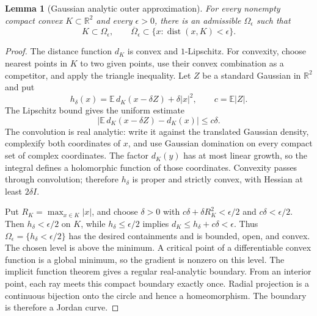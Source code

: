 \documentclass[11pt]{article}
\newcommand{\R}{\mathbb R}
\DeclareMathOperator{\dist}{dist}
\newtheorem{lemma}[theorem]{Lemma}
\theoremstyle{definition}
\theoremstyle{remark}
\numberwithin{equation}{section}
\begin{document}
\begin{lemma}[Gaussian analytic outer approximation]\label{lem:gaussian}
For every nonempty compact convex $K\subset\R^2$ and every $\epsilon>0$,
there is an admissible $\Omega_\epsilon$ such that
\[
 K\subset\Omega_\epsilon,\qquad
 \overline\Omega_\epsilon\subset\{x:\dist(x,K)<\epsilon\}.
\]
\end{lemma}
\begin{proof}
The distance function $d_K$ is convex and $1$-Lipschitz. For convexity,
choose nearest points in $K$ to two given points, use their convex
combination as a competitor, and apply the triangle inequality.
Let $Z$ be a standard Gaussian in $\R^2$ and put
\[
 h_\delta(x)=\mathbb E\,d_K(x-\delta Z)+\delta|x|^2,
 \qquad c=\mathbb E|Z|.
\]
The Lipschitz bound gives the uniform estimate
\[
 \big|\mathbb E\,d_K(x-\delta Z)-d_K(x)\big|\le c\delta.
\]
The convolution is real analytic: write it against the translated
Gaussian density, complexify both coordinates of $x$, and use Gaussian
domination on every compact set of complex coordinates. The factor
$d_K(y)$ has at most linear growth, so the integral defines a holomorphic
function of those coordinates. Convexity passes through convolution;
therefore $h_\delta$ is proper and strictly convex, with Hessian at least
$2\delta I$.

Put $R_K=\max_{x\in K}|x|$, and choose $\delta>0$ with
$c\delta+\delta R_K^2<\epsilon/2$ and $c\delta<\epsilon/2$.
Then $h_\delta<\epsilon/2$ on $K$, while
$h_\delta\le\epsilon/2$ implies
$d_K\le h_\delta+c\delta<\epsilon$. Thus
$\Omega_\epsilon=\{h_\delta<\epsilon/2\}$ has the desired
containments and is bounded, open, and convex. The chosen level is
above the minimum. A critical point of a differentiable convex function
is a global minimum, so the gradient is nonzero on this level.
The implicit function theorem gives a regular real-analytic boundary.
From an interior point, each ray meets this compact boundary exactly
once. Radial projection is a continuous bijection onto the circle and
hence a homeomorphism. The boundary is therefore a Jordan curve.
\end{proof}
\end{document}

